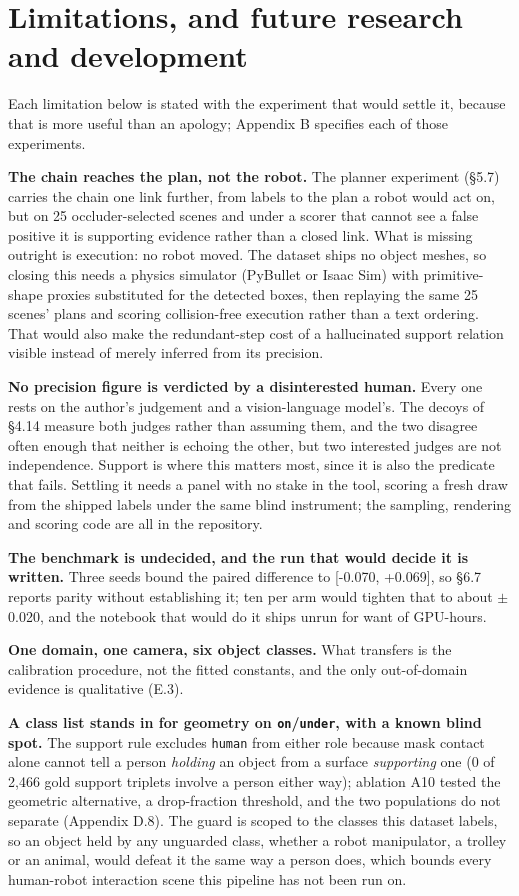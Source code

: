 \section{Limitations, and future research and development}

Each limitation below is stated with the experiment that would settle it, because that is more useful than an apology; Appendix B specifies each of those experiments.

\textbf{The chain reaches the plan, not the robot.} The planner experiment (\S{}5.7) carries the chain one link further, from labels to the plan a robot would act on, but on 25 occluder-selected scenes and under a scorer that cannot see a false positive it is supporting evidence rather than a closed link. What is missing outright is execution: no robot moved. The dataset ships no object meshes, so closing this needs a physics simulator (PyBullet or Isaac Sim) with primitive-shape proxies substituted for the detected boxes, then replaying the same 25 scenes' plans and scoring collision-free execution rather than a text ordering. That would also make the redundant-step cost of a hallucinated support relation visible instead of merely inferred from its precision.

\textbf{No precision figure is verdicted by a disinterested human.} Every one rests on the author's judgement and a vision-language model's. The decoys of \S{}4.14 measure both judges rather than assuming them, and the two disagree often enough that neither is echoing the other, but two interested judges are not independence. Support is where this matters most, since it is also the predicate that fails. Settling it needs a panel with no stake in the tool, scoring a fresh draw from the shipped labels under the same blind instrument; the sampling, rendering and scoring code are all in the repository.

\textbf{The benchmark is undecided, and the run that would decide it is written.} Three seeds bound the paired difference to [-0.070, +0.069], so \S{}6.7 reports parity without establishing it; ten per arm would tighten that to about $\pm$0.020, and the notebook that would do it ships unrun for want of GPU-hours.

\textbf{One domain, one camera, six object classes.} What transfers is the calibration procedure, not the fitted constants, and the only out-of-domain evidence is qualitative (E.3).

\textbf{A class list stands in for geometry on \texttt{on}/\texttt{under}, with a known blind spot.} The support rule excludes \texttt{human} from either role because mask contact alone cannot tell a person \textit{holding} an object from a surface \textit{supporting} one (0 of 2,466 gold support triplets involve a person either way); ablation A10 tested the geometric alternative, a drop-fraction threshold, and the two populations do not separate (Appendix D.8). The guard is scoped to the classes this dataset labels, so an object held by any unguarded class, whether a robot manipulator, a trolley or an animal, would defeat it the same way a person does, which bounds every human-robot interaction scene this pipeline has not been run on.


